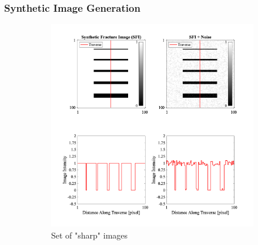 \documentclass{edger}
\begin{document}
\subsubsection{Synthetic Image Generation} \label{sec:Synthetic Fractures}

\begin{figure}[!h]
\centering
    \begin{subfigure}[b]{0.5\textwidth}            
            \includegraphics[width=\textwidth]{3DSyntheticFractureImages.png}
            \caption{Set of "sharp" images}
            \label{fig:Sharp images}
    \end{subfigure}%
    \begin{subfigure}[b]{0.5\textwidth}
            \centering

\end{subfigure}
\end{figure}
\end{document}
